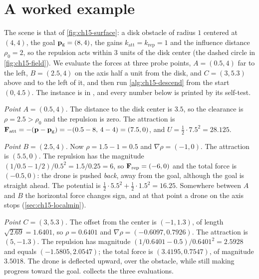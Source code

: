 \section{A worked example}
\label{sec:ch15-example}

\begin{example}
\label{ex:ch15-disc}
The scene is that of \cref{fig:ch15-surface}: a disk obstacle of radius $1$
centered at $(4, 4)$, the goal $\mathbf{p}_{\mathrm{g}} = (8, 4)$, the gains
$k_{\mathrm{att}} = k_{\mathrm{rep}} = 1$ and the influence distance $\rho_0 =
2$, so the repulsion acts within $3$ units of the disk center (the dashed
circle in \cref{fig:ch15-field}). We evaluate the forces at three probe
points, $A = (0.5, 4)$ far to the left, $B = (2.5, 4)$ on the axis half a unit
from the disk, and $C = (3, 5.3)$ above and to the left of it, and then run
\cref{alg:ch15-descend} from the start $(0, 4.5)$. The instance is
 in , and every
number below is printed by its self-test.
\end{example}

\emph{Point $A = (0.5, 4)$.} The distance to the disk center is $3.5$, so the
clearance is $\rho = 2.5 > \rho_0$ and the repulsion is zero. The attraction
is $\mathbf{F}_{\mathrm{att}} = -(\mathbf{p} - \mathbf{p}_{\mathrm{g}}) = -(0.5 - 8,\, 4 - 4)
= (7.5, 0)$, and $U = \tfrac12 \cdot 7.5^2 = 28.125$.

\emph{Point $B = (2.5, 4)$.} Now $\rho = 1.5 - 1 = 0.5$ and $\nabla\rho =
(-1, 0)$. The attraction is $(5.5, 0)$. The repulsion has the magnitude
$(1/0.5 - 1/2)/0.5^2 = 1.5/0.25 = 6$, so $\mathbf{F}_{\mathrm{rep}} = (-6, 0)$
and the total force is $(-0.5, 0)$: the drone is pushed \emph{back}, away
from the goal, although the goal is straight ahead. The potential is
$\tfrac12 \cdot 5.5^2 + \tfrac12 \cdot 1.5^2 = 16.25$. Somewhere between $A$
and $B$ the horizontal force changes sign, and at that point a drone on the
axis stops (\cref{sec:ch15-localmin}).

\emph{Point $C = (3, 5.3)$.} The offset from the center is $(-1, 1.3)$, of
length $\sqrt{2.69} = 1.6401$, so $\rho = 0.6401$ and $\nabla\rho = (-0.6097,
0.7926)$. The attraction is $(5, -1.3)$. The repulsion has magnitude
$(1/0.6401 - 0.5)/0.6401^2 = 2.5928$ and equals $(-1.5805, 2.0547)$; the
total force is $(3.4195, 0.7547)$, of magnitude $3.5018$. The drone is
deflected upward, over the obstacle, while still making progress toward
the goal.  collects the three evaluations.

